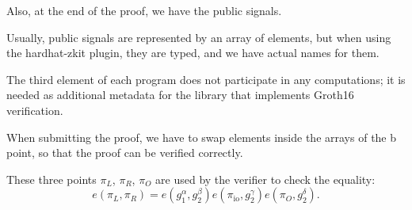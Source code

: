 \documentclass[../lecture-notes.tex]{subfiles}
\begin{document}
    \vspace{0.5cm}

    Also, at the end of the proof, we have the public signals.

    \begin{remark}
        Usually, public signals are represented by an array of elements, but when using the hardhat-zkit plugin,
        they are typed, and we have actual names for them.
    \end{remark}

    The third element of each program does not participate in any computations; it is needed as additional metadata for the library that implements Groth16 verification.

    \begin{remark}
        When submitting the proof, we have to swap elements inside the arrays of the b point, so that the proof can be verified correctly.
    \end{remark}

    These three points $\pi_L$, $\pi_R$, $\pi_O$ are used by the verifier to check the equality:
    \[
        e(\pi_L, \pi_R) = e(g_1^\alpha, g_2^\beta)e(\pi_{\text{io}},g_2^\gamma)e(\pi_O,g_2^\delta).
    \]
\end{document}
